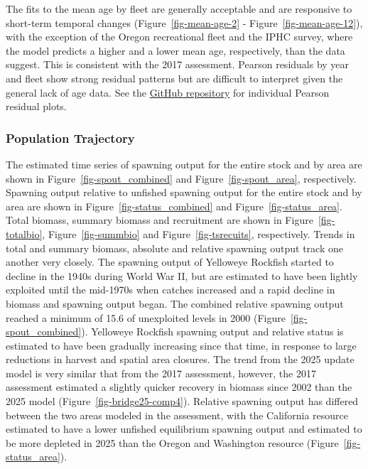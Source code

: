 \documentclass[
  english,
]{article}
\begin{document}
The fits to the mean age by fleet are generally acceptable and are
responsive to short-term temporal changes (Figure~\ref{fig-mean-age-2} -
Figure~\ref{fig-mean-age-12}), with the exception of the Oregon
recreational fleet and the IPHC survey, where the model predicts a
higher and a lower mean age, respectively, than the data suggest. This
is consistent with the 2017 assessment. Pearson residuals by year and
fleet show strong residual patterns but are difficult to interpret given
the general lack of age data. See the
\href{https://github.com/rclairer/Sebastes_ruberrimus_2025}{GitHub
repository} for individual Pearson residual plots.

\subsubsection{Population Trajectory}\label{population-trajectory}

The estimated time series of spawning output for the entire stock and by
area are shown in Figure~\ref{fig-spout_combined} and
Figure~\ref{fig-spout_area}, respectively. Spawning output relative to
unfished spawning output for the entire stock and by area are shown in
Figure~\ref{fig-status_combined} and Figure~\ref{fig-status_area}. Total
biomass, summary biomass and recruitment are shown in
Figure~\ref{fig-totalbio}, Figure~\ref{fig-summbio} and
Figure~\ref{fig-tsrecuits}, respectively. Trends in total and summary
biomass, absolute and relative spawning output track one another very
closely. The spawning output of Yelloweye Rockfish started to decline in
the 1940s during World War II, but are estimated to have been lightly
exploited until the mid-1970s when catches increased and a rapid decline
in biomass and spawning output began. The combined relative spawning
output reached a minimum of 15.6 of unexploited levels in 2000
(Figure~\ref{fig-spout_combined}). Yelloweye Rockfish spawning output
and relative status is estimated to have been gradually increasing since
that time, in response to large reductions in harvest and spatial area
closures. The trend from the 2025 update model is very similar that from
the 2017 assessment, however, the 2017 assessment estimated a slightly
quicker recovery in biomass since 2002 than the 2025 model
(Figure~\ref{fig-bridge25-comp4}). Relative spawning output has differed
between the two areas modeled in the assessment, with the California
resource estimated to have a lower unfished equilibrium spawning output
and estimated to be more depleted in 2025 than the Oregon and Washington
resource (Figure~\ref{fig-status_area}).
\end{document}
